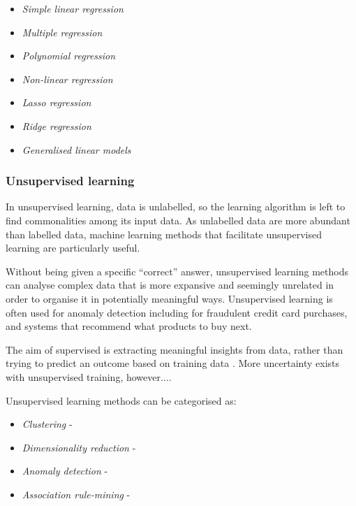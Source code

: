 \documentclass[12pt,a4paper]{article}
\begin{document}
\begin{itemize}
    \item \textit{Simple linear regression}
    \item \textit{Multiple regression}
    \item \textit{Polynomial regression}
    \item \textit{Non-linear regression}
    \item \textit{Lasso regression}
    \item \textit{Ridge regression}
    \item \textit{Generalised linear models}
\end{itemize}

\subsubsection{Unsupervised learning}
In unsupervised learning, data is unlabelled, so the learning algorithm is left to find commonalities among its input data. As unlabelled data are more abundant than labelled data, machine learning methods that facilitate unsupervised learning are particularly useful.

Without being given a specific “correct” answer, unsupervised learning methods can analyse complex data that is more expansive and seemingly unrelated in order to organise it in potentially meaningful ways. Unsupervised learning is often used for anomaly detection including for fraudulent credit card purchases, and systems that recommend what products to buy next.

The aim of supervised is extracting meaningful insights from data, rather than trying to predict an outcome based on training data \cite{Kononenko2007}. More uncertainty exists with unsupervised training, however....

Unsupervised learning methods can be categorised as:
\begin{itemize}
    \item \textit{Clustering} - 
    \item \textit{Dimensionality reduction} -
    \item \textit{Anomaly detection} - 
    \item \textit{Association rule-mining} -
\end{itemize}
\end{document}
